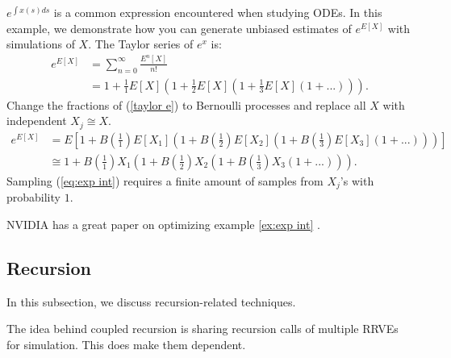 \documentclass[a4paper,12pt]{article}
\begin{document}
\begin{example}[$e^{E[X]}$] \label{ex:exp int}
    $e^{\int x(s)ds}$ is a common expression encountered when studying ODEs.
    In this example, we demonstrate how you can generate unbiased estimates of
    $e^{E[X]}$ with simulations of $X$. The Taylor series of $e^{x}$ is:
    \begin{align}
        e^{E[X]} & = \sum_{n=0}^{\infty} \frac{E^{n}[X]}{n!}     \\
                 & = 1 + \frac{1}{1}E[X]\left(1+ \frac{1}{2}E[X]
        \left(1+\frac{1}{3}E[X]\left(1+ ...\right)\right)\right). \label{taylor e}
    \end{align}
    Change the fractions of (\ref{taylor e}) to Bernoulli processes
    and replace all $X$ with independent $X_j \cong X$.
    \begin{align}
        e^{E[X]} & = E
        \left[1 + B\left(\frac{1}{1}\right)E[X_1]
        \left(1+ B\left(\frac{1}{2}\right)E[X_2]
        \left(1+B\left(\frac{1}{3}\right)E[X_3]
        \left(1+ ...\right)
        \right)
        \right)
        \right]                             \\
                 & \cong \label{eq:exp int}
        1 + B\left(\frac{1}{1}\right)X_1
        \left(1+ B\left(\frac{1}{2}\right)X_2
        \left(1+B\left(\frac{1}{3}\right)X_3
            \left(1+ ...\right)
            \right)
        \right).
    \end{align}
    Sampling (\ref{eq:exp int}) requires a finite amount of samples from $X_{j}$'s
    with probability $1$.
\end{example}

\begin{related}
    NVIDIA has a great paper on optimizing example \ref{ex:exp int}
    \cite{kettunen_unbiased_2021}.
\end{related}

\subsection{Recursion}

In this subsection, we discuss recursion-related techniques.

\begin{technique}
    The idea behind coupled recursion is sharing recursion calls of
    multiple RRVEs for simulation. This does make them dependent.
\end{technique}
\end{document}
